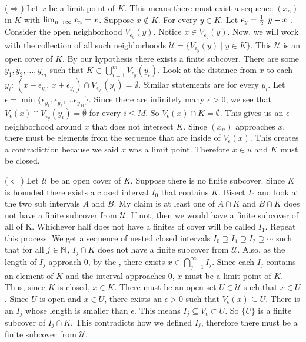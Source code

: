 {    \begin{customframedproof}[linecolor=xgray]
        \begin{proofpart}[xgray]{(\(\Rightarrow\))}
            Let \(x\) be a limit point of \(K\). This means there must exist a sequence \((x_n)\) in \(K\) with \(\lim_{n \rightarrow \infty}x_n = x\). Suppose \(x \notin K\). For every \(y \in K\). Let \(\epsilon_y = \frac{1}{2}\left|y-x\right|\). Consider the open neighborhood \(V_{\epsilon_y}(y)\). Notice \(x \in V_{\epsilon_y} (y)\). Now, we will work with the collection of all such neighborhoods \(\mathcal{U} = \{V_{\epsilon_y}(y) \mid y \in K\}\). This \(\mathcal{U}\) is an open cover of \(K\). By our hypothesis there exists a finite subcover. There are some \(y_1,y_2,\dots,y_m\) such that \(K \subset \bigcup_{i = 1}^m V_{\epsilon_y}(y_i)\). Look at the distance from \(x\) to each \(y_i\): \((x - \epsilon_{y_i}\text{, } x + \epsilon_{y_i}) \cap V_{\epsilon_{y_i}} (y_i) = \emptyset\). Similar statements are for every \(y_i\). Let \(\epsilon = \min\{\epsilon_{y_1}, \epsilon_{y_2},\dots \epsilon_{y_M}\}\). Since there are infinitely many \(\epsilon > 0\), we see that \(V_\epsilon(x)\cap V_{\epsilon_y}(y_i) = \emptyset\) for every \(i \leq M\). So \(V_\epsilon (x) \cap K = \emptyset\). This gives us an \(\epsilon\)-neighborhood around \(x\) that does not intersect \(K\). Since \((x_n)\) approaches \(x\), there must be elements from the sequence that are inside of \(V_\epsilon(x)\). This creates a contradiction because we said \(x\) was a limit point. Therefore \(x \in u\) and \(K\) must be closed.
        \end{proofpart}
    \vspace{2mm}
            \begin{proofpart}[xgray]{(\(\Leftarrow\))}
                Let \(\mathcal{U}\) be an open cover of \(K\). Suppose there is no finite subcover. Since \(K\) is bounded there exists a closed interval \(I_0\) that contains \(K\). Bisect \(I_0\) and look at the two sub intervals \(A\) and \(B\). My claim is at least one of \(A \cap K\) and \(B \cap K\) does not have a finite subcover from \(\mathcal{U}\). If not, then we would have a finite subcover of all of K. Whichever half does not have a finites of cover will be called \(I_1\). Repeat this process. We get a sequence of nested closed intervals \(I_0 \supseteq I_1 \supseteq I_2 \supseteq \cdots\) such that for all \(j \in \mathbb{N}\), \(I_j \cap K\) does not have a finite subcover from \(\mathcal{U}\). Also, as the length of \(I_j\) approach 0, by the , there exists \(x \in \bigcap_{j = 1}^{\infty} I_j\). Since each \(I_j\) contains an element of \(K\) and the interval approaches 0, \(x\) must be a limit point of \(K\). Thus, since \(K\) is closed, \(x \in K\). There must be an open set \(U \in \mathcal{U}\) such that \(x \in U\). Since \(U\) is open and \(x \in U\), there exists an \(\epsilon > 0\) such that \(V_\epsilon(x) \subseteq U\). There is an \(I_j\) whose length is smaller than \(\epsilon\). This means \(I_j \subseteq V_\epsilon \subset U\). So \(\{U\}\) is a finite subcover of \(I_j \cap K\). This contradicts how we defined \(I_j\), therefore there must be a finite subcover from \(\mathcal{U}\). \qedhere

\end{proofpart}
\end{customframedproof}}
